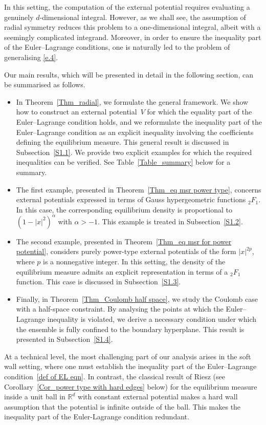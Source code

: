 \documentclass[10pt]{amsart}
\theoremstyle{plain}
\theoremstyle{remark}
\numberwithin{equation}{section}
\begin{document}
In this setting, the computation of the external potential requires evaluating a genuinely $d$-dimensional integral. 
However, as we shall see, the assumption of radial symmetry reduces this problem to a one-dimensional integral, albeit with a seemingly complicated integrand. 
Moreover, in order to ensure the inequality part of the Euler--Lagrange 
conditions, one is naturally led to the problem of generalising \eqref{e.4}.

Our main results, which will be presented in detail in the following section, can be summarised as follows.
\begin{itemize}
    \item In Theorem~\ref{Thm_radial}, we formulate the general framework. 
    We show how to construct an external potential~$V$ for which the equality part of the Euler--Lagrange condition holds, and we reformulate the inequality part of the Euler--Lagrange condition as an explicit inequality involving the coefficients defining the equilibrium measure. 
    This general result is discussed in Subsection~\ref{S1.1}. 
    We provide two explicit examples for which the required inequalities can be verified. See Table~\ref{Table_summary} below for a summary. 
    \smallskip 
    \item The first example, presented in Theorem~\ref{Thm_eq msr power type}, concerns external potentials expressed in terms of Gauss hypergeometric functions ${}_2F_1$. 
    In this case, the corresponding equilibrium density is proportional to 
    $(1-|x|^2)^{\alpha}$ with $\alpha>-1$. This example is treated in Subsection~\ref{S1.2}.
    \smallskip 
    \item The second example, presented in Theorem~\ref{Thm_eq msr for power potential}, considers purely power-type external potentials of the form $|x|^{2p}$, where $p$ is a nonnegative integer. 
    In this setting, the density of the equilibrium measure admits an explicit representation in terms of a ${}_2F_1$ function. 
    This case is discussed in Subsection~\ref{S1.3}.
    \smallskip 
    \item Finally, in Theorem~\ref{Thm_Coulomb half space}, we study the Coulomb case with a half-space constraint. 
    By analysing the points at which the Euler--Lagrange inequality is violated, we derive a necessary condition under which the ensemble is fully confined to the boundary hyperplane. 
    This result is presented in Subsection~\ref{S1.4}.
\end{itemize}

At a technical level, the most challenging part of our analysis arises in the soft wall setting, where one must establish the inequality part of the Euler--Lagrange condition~\eqref{def of EL eqn}.
In contrast, the classical result of Riesz \cite{Riesz38} (see Corollary~\ref{Cor_power type with hard edges} below) for the equilibrium measure inside a unit ball in $\mathbb R^d$ with constant external potential makes a hard wall assumption that the potential is infinite outside of the ball. This makes the inequality part of the Euler-Lagrange condition redundant.
 
\end{document}

